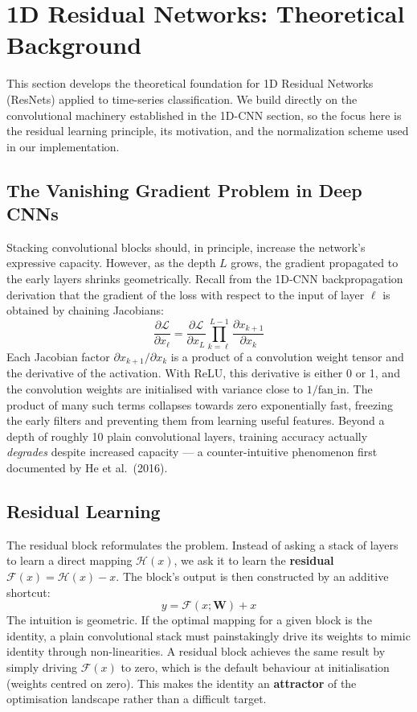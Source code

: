 \section{1D Residual Networks: Theoretical Background}
This section develops the theoretical foundation for 1D Residual Networks (ResNets) applied to time-series classification. We build directly on the convolutional machinery established in the 1D-CNN section, so the focus here is the residual learning principle, its motivation, and the normalization scheme used in our implementation.

\subsection{The Vanishing Gradient Problem in Deep CNNs}
Stacking convolutional blocks should, in principle, increase the network's expressive capacity. However, as the depth $L$ grows, the gradient propagated to the early layers shrinks geometrically. Recall from the 1D-CNN backpropagation derivation that the gradient of the loss with respect to the input of layer $\ell$ is obtained by chaining Jacobians:
\begin{equation}
    \frac{\partial \mathcal{L}}{\partial x_{\ell}} = \frac{\partial \mathcal{L}}{\partial x_{L}} \prod_{k=\ell}^{L-1} \frac{\partial x_{k+1}}{\partial x_{k}}
\end{equation}
Each Jacobian factor $\partial x_{k+1}/\partial x_{k}$ is a product of a convolution weight tensor and the derivative of the activation. With ReLU, this derivative is either 0 or 1, and the convolution weights are initialised with variance close to $1/\text{fan\_in}$. The product of many such terms collapses towards zero exponentially fast, freezing the early filters and preventing them from learning useful features. Beyond a depth of roughly 10 plain convolutional layers, training accuracy actually \textit{degrades} despite increased capacity --- a counter-intuitive phenomenon first documented by He et al.\ (2016).

\subsection{Residual Learning}
The residual block reformulates the problem. Instead of asking a stack of layers to learn a direct mapping $\mathcal{H}(x)$, we ask it to learn the \textbf{residual} $\mathcal{F}(x) = \mathcal{H}(x) - x$. The block's output is then constructed by an additive shortcut:
\begin{equation}
    y = \mathcal{F}(x; \mathbf{W}) + x
\end{equation}
The intuition is geometric. If the optimal mapping for a given block is the identity, a plain convolutional stack must painstakingly drive its weights to mimic identity through non-linearities. A residual block achieves the same result by simply driving $\mathcal{F}(x)$ to zero, which is the default behaviour at initialisation (weights centred on zero). This makes the identity an \textbf{attractor} of the optimisation landscape rather than a difficult target.

